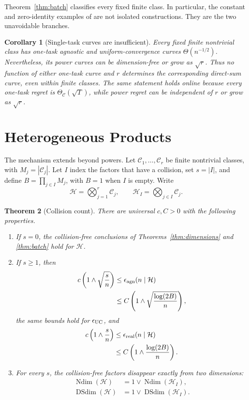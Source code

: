 \documentclass[twoside]{article}
\newtheorem{theorem}{Theorem}
\newtheorem{corollary}[theorem]{Corollary}
\newcommand{\C}{\mathcal C}
\newcommand{\Ndim}{\operatorname{Ndim}}
\newcommand{\DSdim}{\operatorname{DSdim}}
\begin{document}
Theorem~\ref{thm:batch} classifies every fixed finite class. In particular, the constant and zero-identity examples of \citet{more2026} are not isolated constructions. They are the two unavoidable branches.

\begin{corollary}[Single-task curves are insufficient]
\label{cor:insufficient}
Every fixed finite nontrivial class has one-task agnostic and uniform-convergence curves $\Theta(n^{-1/2})$. Nevertheless, its power curves can be dimension-free or grow as $\sqrt r$. Thus no function of either one-task curve and $r$ determines the corresponding direct-sum curve, even within finite classes. The same statement holds online because every one-task regret is $\Theta_{\C}(\sqrt T)$, while power regret can be independent of $r$ or grow as $\sqrt r$.
\end{corollary}

\section{Heterogeneous Products}
\label{sec:heterogeneous}

The mechanism extends beyond powers. Let $\C_1,\ldots,\C_r$ be finite nontrivial classes, with $M_j=|\C_j|$. Let $I$ index the factors that have a collision, set $s=|I|$, and define $B=\prod_{j\in I}M_j$, with $B=1$ when $I$ is empty. Write
\[
 \mathcal H=\bigotimes_{j=1}^r\C_j,
 \qquad
 \mathcal H_I=\bigotimes_{j\in I}\C_j.
\]

\begin{theorem}[Collision count]
\label{thm:heterogeneous}
There are universal $c,C>0$ with the following properties.
\begin{enumerate}
\item If $s=0$, the collision-free conclusions of Theorems~\ref{thm:dimensions} and \ref{thm:batch} hold for $\mathcal H$.
\item If $s\geq1$, then
\begin{align*}
 c\left(1\wedge\sqrt{\frac sn}\right)
 &\leq\epsilon_{\rm agn}(n\mid\mathcal H)\\
 &\leq C\left(1\wedge\sqrt{\frac{\log(2B)}n}\right),
\end{align*}
the same bounds hold for $\epsilon_{\rm UC}$, and
\begin{align*}
 c\left(1\wedge\frac sn\right)
 &\leq\epsilon_{\rm real}(n\mid\mathcal H)\\
 &\leq C\left(1\wedge\frac{\log(2B)}n\right).
\end{align*}
\item For every $s$, the collision-free factors disappear exactly from two dimensions:
\begin{align*}
 \Ndim(\mathcal H)&=1\vee\Ndim(\mathcal H_I),\\
 \DSdim(\mathcal H)&=1\vee\DSdim(\mathcal H_I).
\end{align*}
\end{enumerate}
\end{theorem}
\end{document}

